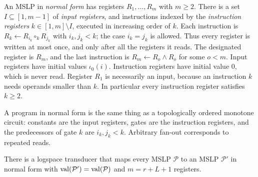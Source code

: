 \begin{definition}\label{def:normalform}
An MSLP in \emph{normal form} has registers $R_1,\dots,R_m$ with $m\ge 2$. There is a set
$I\subseteq[1,m-1]$ of \emph{input registers}, and instructions indexed by the
\emph{instruction registers} $k\in[1,m]\setminus I$, executed in increasing order of $k$. Each
instruction is $R_k\leftarrow R_{i_k}\circ_k R_{j_k}$ with $i_k,j_k<k$; the case $i_k=j_k$ is
allowed. Thus every register is written at most once, and only after all the registers it reads.
The designated register is $R_m$, and the last instruction is $R_m\leftarrow R_o\wedge R_o$ for
some $o<m$. Input registers have initial values $\iota_0(i)$. Instruction registers have initial
value $0$, which is never read. Register $R_1$ is necessarily an input, because an instruction $k$
needs operands smaller than $k$. In particular every instruction register satisfies $k\ge 2$.
\end{definition}

A program in normal form is the same thing as a topologically ordered monotone circuit: constants
are the input registers, gates are the instruction registers, and the predecessors of gate $k$ are
$i_k,j_k<k$. Arbitrary fan-out corresponds to repeated reads.

\begin{lemma}\label{lem:normalform}
There is a logspace transducer that maps every MSLP $\mathcal P$ to an MSLP $\mathcal P'$ in normal
form with $\operatorname{val}(\mathcal P')=\operatorname{val}(\mathcal P)$ and $m=r+L+1$ registers.
\end{lemma}

